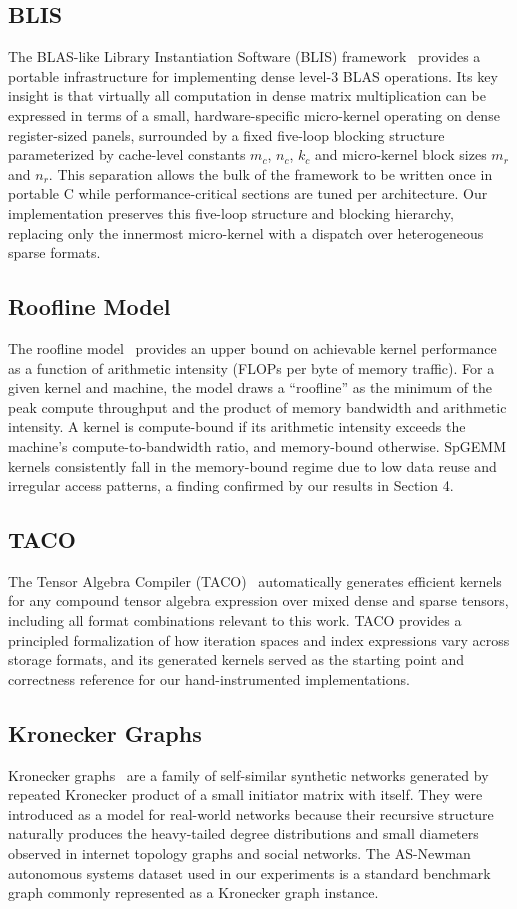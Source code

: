 \documentclass[sigconf, review, anonymous]{acmart}
\begin{document}
\subsection{BLIS}
The BLAS-like Library Instantiation Software (BLIS) framework~\cite{blis} provides a
portable infrastructure for implementing dense level-3 BLAS operations. Its key insight
is that virtually all computation in dense matrix multiplication can be expressed in
terms of a small, hardware-specific micro-kernel operating on dense register-sized
panels, surrounded by a fixed five-loop blocking structure parameterized by cache-level
constants $m_c$, $n_c$, $k_c$ and micro-kernel block sizes $m_r$ and $n_r$. This
separation allows the bulk of the framework to be written once in portable C while
performance-critical sections are tuned per architecture. Our implementation preserves
this five-loop structure and blocking hierarchy, replacing only the innermost
micro-kernel with a dispatch over heterogeneous sparse formats.

\subsection{Roofline Model}
The roofline model~\cite{roofline} provides an upper bound on achievable kernel
performance as a function of arithmetic intensity (FLOPs per byte of memory traffic).
For a given kernel and machine, the model draws a ``roofline'' as the minimum of the
peak compute throughput and the product of memory bandwidth and arithmetic intensity. A
kernel is compute-bound if its arithmetic intensity exceeds the machine's
compute-to-bandwidth ratio, and memory-bound otherwise. SpGEMM kernels consistently
fall in the memory-bound regime due to low data reuse and irregular access patterns, a
finding confirmed by our results in Section 4.

\subsection{TACO}
The Tensor Algebra Compiler (TACO)~\cite{taco} automatically generates efficient
kernels for any compound tensor algebra expression over mixed dense and sparse tensors,
including all format combinations relevant to this work. TACO provides a principled
formalization of how iteration spaces and index expressions vary across storage formats,
and its generated kernels served as the starting point and correctness reference for our
hand-instrumented implementations.

\subsection{Kronecker Graphs}
Kronecker graphs~\cite{kronecker} are a family of self-similar synthetic networks
generated by repeated Kronecker product of a small initiator matrix with itself. They
were introduced as a model for real-world networks because their recursive structure
naturally produces the heavy-tailed degree distributions and small diameters observed
in internet topology graphs and social networks. The AS-Newman autonomous systems
dataset used in our experiments is a standard benchmark graph commonly represented as
a Kronecker graph instance.
\end{document}
